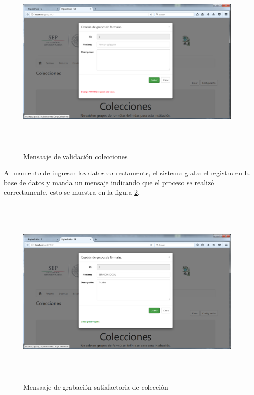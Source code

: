 			\begin{figure}[]
		        \centering
		        \includegraphics[width=16cm, height=9.5cm]{figuras/ColeccionesValida}
		        \caption{Mensaaje de validaci\'on colecciones.}
		        \label{fig_ColeccionesValida}
		    \end{figure}

		    Al momento de ingresar los datos correctamente, el sistema graba el registro en la base de datos y manda un mensaje indicando que el proceso se realiz\'o correctamente, esto se muestra en la figura \ref{img_ColeccionesGraba}.\\

		    \begin{figure}[]
		        \centering
		        \includegraphics[width=16cm, height=9.5cm]{figuras/ColeccionesGraba}
		        \caption{Mensaaje de grabaci\'on satisfactoria de colecci\'on.}
		        \label{img_ColeccionesGraba}
		    \end{figure}

